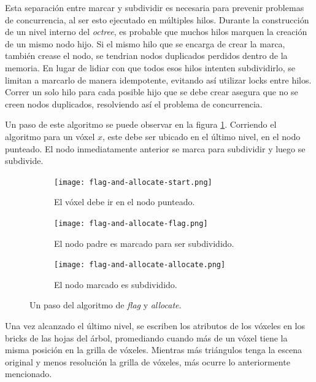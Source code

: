 Esta separación entre marcar y subdividir es necesaria para prevenir problemas de concurrencia, al ser esto ejecutado en múltiples hilos.
Durante la construcción de un nivel interno del \textit{octree}, es probable que muchos hilos marquen la creación de un mismo nodo hijo.
Si el mismo hilo que se encarga de crear la marca, también crease el nodo, se tendrian nodos duplicados perdidos dentro de la memoria.
En lugar de lidiar con que todos esos hilos intenten subdividirlo, se limitan a marcarlo de manera idempotente, evitando así utilizar locks entre hilos.
Correr un solo hilo para cada posible hijo que se debe crear asegura que no se creen nodos duplicados, resolviendo así el problema de concurrencia.

Un paso de este algoritmo se puede observar en la figura \ref{fig:flag-and-allocate}.
Corriendo el algoritmo para un vóxel $x$, este debe ser ubicado en el último nivel, en el nodo punteado.
El nodo inmediatamente anterior se marca para subdividir y luego se subdivide.

\begin{figure}[ht]
    \begin{subfigure}{.32\textwidth}
        \centering
        \texttt{[image: flag-and-allocate-start.png]}
        \caption{El vóxel debe ir en el nodo punteado.}
    \end{subfigure}
    \begin{subfigure}{.32\textwidth}
        \centering
        \texttt{[image: flag-and-allocate-flag.png]}
        \caption{El nodo padre es marcado para ser subdividido.}
    \end{subfigure}
    \begin{subfigure}{.32\textwidth}
        \centering
        \texttt{[image: flag-and-allocate-allocate.png]}
        \caption{El nodo marcado es subdividido.}
    \end{subfigure}
    \caption{Un paso del algoritmo de \textit{flag} y \textit{allocate}.}
    \label{fig:flag-and-allocate}
\end{figure}

Una vez alcanzado el último nivel, se escriben los atributos de los vóxeles en los bricks de las hojas del árbol, promediando cuando más de un vóxel tiene la misma posición en la grilla de vóxeles.
Mientras más triángulos tenga la escena original y menos resolución la grilla de vóxeles, más ocurre lo anteriormente mencionado.

